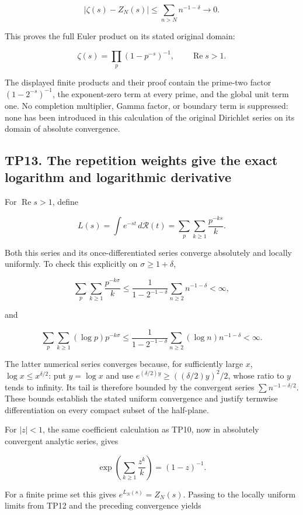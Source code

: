\documentclass[
]{article}
\newcounter{none} %
\begin{document}
\[
|\zeta(s)-Z_N(s)|\le\sum_{n>N}n^{-1-\delta}\longrightarrow0.
\]

This proves the full Euler product on its stated original domain:

\[
\boxed{\zeta(s)=\prod_p(1-p^{-s})^{-1},\qquad\operatorname{Re}s>1.}
\]

The displayed finite products and their proof contain the prime-two
factor \((1-2^{-s})^{-1}\), the exponent-zero term at every prime, and
the global unit term one. No completion multiplier, Gamma factor, or
boundary term is suppressed: none has been introduced in this
calculation of the original Dirichlet series on its domain of absolute
convergence.

\subsection{TP13. The repetition weights give the exact logarithm and
logarithmic
derivative}\label{tp13.-the-repetition-weights-give-the-exact-logarithm-and-logarithmic-derivative}

For \(\operatorname{Re}s>1\), define

\[
L(s)=\int e^{-st}\,d\mathcal R(t)
=\sum_p\sum_{k\ge1}\frac{p^{-ks}}k.
\]

Both this series and its once-differentiated series converge absolutely
and locally uniformly. To check this explicitly on
\(\sigma\ge1+\delta\),

\[
\sum_p\sum_{k\ge1}\frac{p^{-k\sigma}}k
\le\frac{1}{1-2^{-1-\delta}}\sum_{n\ge2}n^{-1-\delta}<\infty,
\]

and

\[
\sum_p\sum_{k\ge1}(\log p)p^{-k\sigma}
\le\frac{1}{1-2^{-1-\delta}}\sum_{n\ge2}(\log n)n^{-1-\delta}<\infty.
\]

The latter numerical series converges because, for sufficiently large
\(x\), \(\log x\le x^{\delta/2}\): put \(y=\log x\) and use
\(e^{(\delta/2)y}\ge((\delta/2)y)^2/2\), whose ratio to \(y\) tends to
infinity. Its tail is therefore bounded by the convergent series
\(\sum n^{-1-\delta/2}\). These bounds establish the stated uniform
convergence and justify termwise differentiation on every compact subset
of the half-plane.

For \(|z|<1\), the same coefficient calculation as TP10, now in
absolutely convergent analytic series, gives

\[
\exp\left(\sum_{k\ge1}\frac{z^k}{k}\right)=(1-z)^{-1}.
\]

For a finite prime set this gives \(e^{L_N(s)}=Z_N(s)\). Passing to the
locally uniform limits from TP12 and the preceding convergence yields
\end{document}
